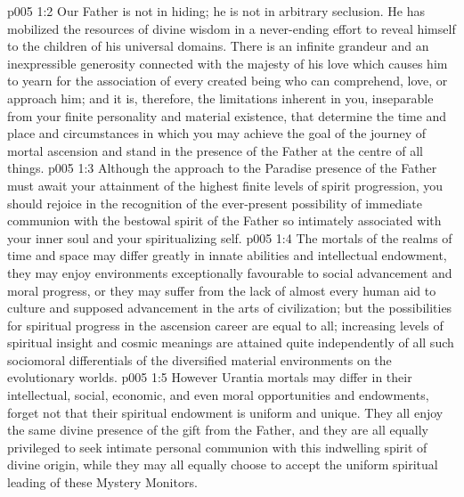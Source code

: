 \vs p005 1:2 Our Father is not in hiding; he is not in arbitrary seclusion. He has mobilized the resources of divine wisdom in a never\hyp{}ending effort to reveal himself to the children of his universal domains. There is an infinite grandeur and an inexpressible generosity connected with the majesty of his love which causes him to yearn for the association of every created being who can comprehend, love, or approach him; and it is, therefore, the limitations inherent in you, inseparable from your finite personality and material existence, that determine the time and place and circumstances in which you may achieve the goal of the journey of mortal ascension and stand in the presence of the Father at the centre of all things.
\vs p005 1:3 \pc Although the approach to the Paradise presence of the Father must await your attainment of the highest finite levels of spirit progression, you should rejoice in the recognition of the ever\hyp{}present possibility of immediate communion with the bestowal spirit of the Father so intimately associated with your inner soul and your spiritualizing self.
\vs p005 1:4 The mortals of the realms of time and space may differ greatly in innate abilities and intellectual endowment, they may enjoy environments exceptionally favourable to social advancement and moral progress, or they may suffer from the lack of almost every human aid to culture and supposed advancement in the arts of civilization; but the possibilities for spiritual progress in the ascension career are equal to all; increasing levels of spiritual insight and cosmic meanings are attained quite independently of all such sociomoral differentials of the diversified material environments on the evolutionary worlds.
\vs p005 1:5 However Urantia mortals may differ in their intellectual, social, economic, and even moral opportunities and endowments, forget not that their spiritual endowment is uniform and unique. They all enjoy the same divine presence of the gift from the Father, and they are all equally privileged to seek intimate personal communion with this indwelling spirit of divine origin, while they may all equally choose to accept the uniform spiritual leading of these Mystery Monitors.
